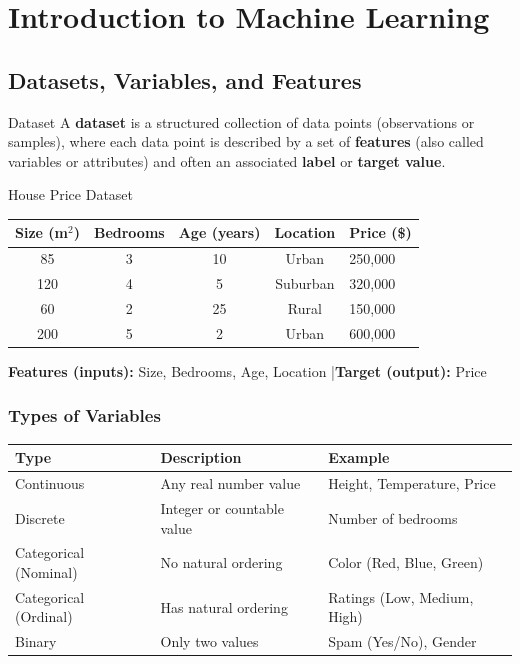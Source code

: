 \documentclass[12pt,a4paper]{report}
\begin{document}
\chapter{Introduction to Machine Learning}

\section{Datasets, Variables, and Features}

\begin{defbox}{Dataset}
A \textbf{dataset} is a structured collection of data points (observations or samples), where each data point is described by a set of \textbf{features} (also called variables or attributes) and often an associated \textbf{label} or \textbf{target value}.
\end{defbox}

\begin{examplebox}{House Price Dataset}
\begin{center}
\begin{tabular}{ccccl}
\toprule
\textbf{Size (m$^2$)} & \textbf{Bedrooms} & \textbf{Age (years)} & \textbf{Location} & \textbf{Price (\$)} \\
\midrule
85 & 3 & 10 & Urban & 250,000 \\
120 & 4 & 5 & Suburban & 320,000 \\
60 & 2 & 25 & Rural & 150,000 \\
200 & 5 & 2 & Urban & 600,000 \\
\bottomrule
\end{tabular}
\end{center}
\vspace{0.2cm}
\textbf{Features (inputs):} Size, Bedrooms, Age, Location \quad|\quad \textbf{Target (output):} Price
\end{examplebox}

\subsection{Types of Variables}

\begin{center}
\begin{tabular}{lll}
\toprule
\textbf{Type} & \textbf{Description} & \textbf{Example} \\
\midrule
Continuous & Any real number value & Height, Temperature, Price \\
Discrete & Integer or countable value & Number of bedrooms \\
Categorical (Nominal) & No natural ordering & Color (Red, Blue, Green) \\
Categorical (Ordinal) & Has natural ordering & Ratings (Low, Medium, High) \\
Binary & Only two values & Spam (Yes/No), Gender \\
\bottomrule
\end{tabular}
\end{center}
\end{document}

